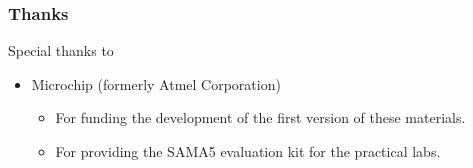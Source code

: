 \begin{frame}
\frametitle{Thanks}
   Special thanks to
   \begin{itemize}
     \item Microchip (formerly Atmel Corporation) \\
     \begin{itemize}
	   \item For funding the development of the first version of
                 these materials.
	   \item For providing the SAMA5 evaluation kit for the
		 practical labs.
     \end{itemize}
   \end{itemize}
\end{frame}
